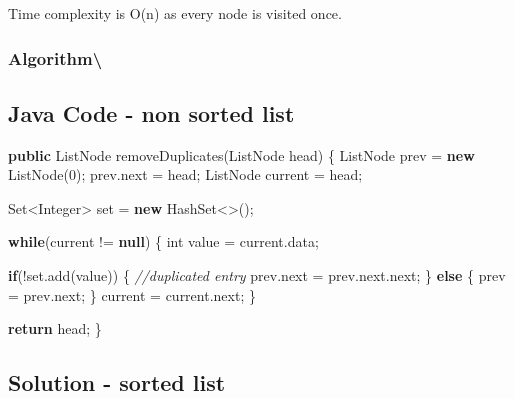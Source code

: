 \documentclass[]{book}
\newenvironment{Shaded}{\begin{snugshade}}{\end{snugshade}}
\newcommand{\BuiltInTok}[1]{#1}
\newcommand{\CommentTok}[1]{\textcolor[rgb]{0.56,0.35,0.01}{\textit{#1}}}
\newcommand{\DataTypeTok}[1]{\textcolor[rgb]{0.13,0.29,0.53}{#1}}
\newcommand{\DecValTok}[1]{\textcolor[rgb]{0.00,0.00,0.81}{#1}}
\newcommand{\FunctionTok}[1]{\textcolor[rgb]{0.00,0.00,0.00}{#1}}
\newcommand{\KeywordTok}[1]{\textcolor[rgb]{0.13,0.29,0.53}{\textbf{#1}}}
\newcommand{\NormalTok}[1]{#1}
\begin{document}
Time complexity is O(n) as every node is visited once.

\hypertarget{algorithm-129}{%
\subsubsection{Algorithm\textbackslash{}}\label{algorithm-129}}

\hypertarget{java-code---non-sorted-list}{%
\subsection{Java Code - non sorted list}\label{java-code---non-sorted-list}}

\begin{Shaded}
\begin{Highlighting}[]
\KeywordTok{public}\NormalTok{ ListNode }\FunctionTok{removeDuplicates}\NormalTok{(ListNode head) \{}
\NormalTok{    ListNode prev = }\KeywordTok{new} \FunctionTok{ListNode}\NormalTok{(}\DecValTok{0}\NormalTok{);}
\NormalTok{    prev.}\FunctionTok{next}\NormalTok{ = head;}
\NormalTok{    ListNode current = head;}

    \BuiltInTok{Set}\NormalTok{<}\BuiltInTok{Integer}\NormalTok{> set = }\KeywordTok{new} \BuiltInTok{HashSet}\NormalTok{<>();}

    \KeywordTok{while}\NormalTok{(current != }\KeywordTok{null}\NormalTok{) \{}
        \DataTypeTok{int}\NormalTok{ value = current.}\FunctionTok{data}\NormalTok{;}

        \KeywordTok{if}\NormalTok{(!set.}\FunctionTok{add}\NormalTok{(value)) \{}
            \CommentTok{//duplicated entry}
\NormalTok{            prev.}\FunctionTok{next}\NormalTok{ = prev.}\FunctionTok{next}\NormalTok{.}\FunctionTok{next}\NormalTok{;}
\NormalTok{        \} }\KeywordTok{else}\NormalTok{ \{}
\NormalTok{            prev = prev.}\FunctionTok{next}\NormalTok{;}
\NormalTok{        \}}
\NormalTok{        current = current.}\FunctionTok{next}\NormalTok{;}
\NormalTok{    \}}

    \KeywordTok{return}\NormalTok{ head;}
\NormalTok{\}}
\end{Highlighting}
\end{Shaded}

\hypertarget{solution---sorted-list}{%
\subsection{Solution - sorted list}\label{solution---sorted-list}}
\end{document}
